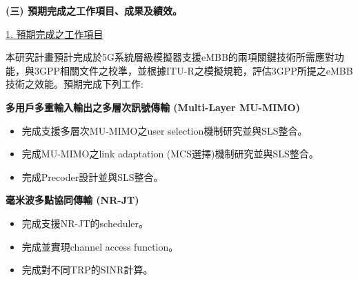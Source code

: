 \documentclass[a4paper,12pt]{article}%
\begin{document}
{%



\noindent \textbf{(三)	預期完成之工作項目、成果及績效。}

\noindent \underline{1. 預期完成之工作項目}

本研究計畫預計完成於5G系統層級模擬器支援eMBB的兩項關鍵技術所需應對功能，與3GPP相關文件之校準，並根據ITU-R之模擬規範，評估3GPP所提之eMBB技術之效能。預期完成下列工作:

\noindent \textbf{多用戶多重輸入輸出之多層次訊號傳輸 (Multi-Layer MU-MIMO)}
\begin{itemize}[noitemsep]

   \item 完成支援多層次MU-MIMO之user selection機制研究並與SLS整合。
   \item 完成MU-MIMO之link adaptation (MCS選擇)機制研究並與SLS整合。
   \item 完成Precoder設計並與SLS整合。
\end{itemize}

\noindent \textbf{毫米波多點協同傳輸 (NR-JT)}
\begin{itemize}[noitemsep]
\item 完成支援NR-JT的scheduler。
\item 完成並實現channel access function。
\item 完成對不同TRP的SINR計算。
\end{itemize}




}
\end{document}

